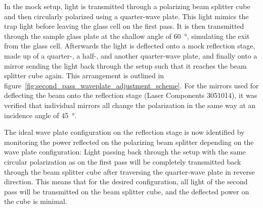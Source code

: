 In the mock setup, light is transmitted through a polarizing beam splitter cube and then circularly polarized using a quarter-wave plate. This light mimics the trap light before leaving the glass cell on the first pass. It is then transmitted through the sample glass plate at the shallow angle of \SI{60}{\degree}, simulating the exit from the glass cell. Afterwards the light is deflected onto a mock reflection stage, made up of a quarter-, a half-, and another quarter-wave plate, and finally onto a mirror sending the light back through the setup such that it reaches the beam splitter cube again. This arrangement is outlined in figure~\ref{fig:second_pass_waveplate_adjustment_scheme}. For the mirrors used for deflecting the beam onto the reflection stage (Laser Components 3051014), it was verified that individual mirrors all change the polarization in the same way at an incidence angle of \SI{45}{\degree}.

The ideal wave plate configuration on the reflection stage is now identified by monitoring the power reflected on the polarizing beam splitter depending on the wave plate configuration: Light passing back through the setup with the same circular polarization as on the first pass will be completely transmitted back through the beam splitter cube after traversing the quarter-wave plate in reverse direction. This means that for the desired configuration, all light of the second pass will be transmitted on the beam splitter cube, and the deflected power on the cube is minimal.

